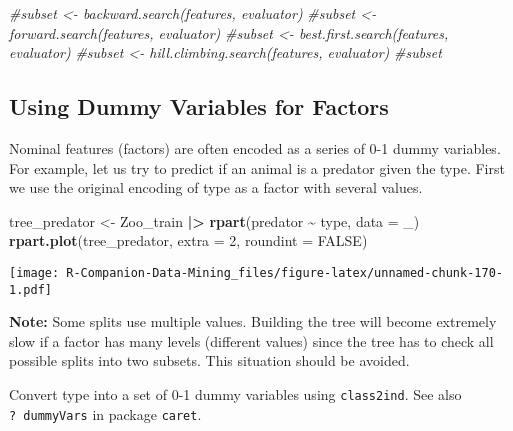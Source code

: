 \documentclass[
  notitlepage]{book}
\newenvironment{Shaded}{\begin{snugshade}}{\end{snugshade}}
\newcommand{\CommentTok}[1]{\textcolor[rgb]{0.56,0.35,0.01}{\textit{#1}}}
\newcommand{\DataTypeTok}[1]{\textcolor[rgb]{0.13,0.29,0.53}{#1}}
\newcommand{\DecValTok}[1]{\textcolor[rgb]{0.00,0.00,0.81}{#1}}
\newcommand{\ErrorTok}[1]{\textcolor[rgb]{0.64,0.00,0.00}{\textbf{#1}}}
\newcommand{\KeywordTok}[1]{\textcolor[rgb]{0.13,0.29,0.53}{\textbf{#1}}}
\newcommand{\NormalTok}[1]{#1}
\newcommand{\OperatorTok}[1]{\textcolor[rgb]{0.81,0.36,0.00}{\textbf{#1}}}
\newcommand{\OtherTok}[1]{\textcolor[rgb]{0.56,0.35,0.01}{#1}}
\newcommand{\StringTok}[1]{\textcolor[rgb]{0.31,0.60,0.02}{#1}}
\begin{document}
\begin{Shaded}
\begin{Highlighting}[]
\CommentTok{\#subset \textless{}{-} backward.search(features, evaluator)}
\CommentTok{\#subset \textless{}{-} forward.search(features, evaluator)}
\CommentTok{\#subset \textless{}{-} best.first.search(features, evaluator)}
\CommentTok{\#subset \textless{}{-} hill.climbing.search(features, evaluator)}
\CommentTok{\#subset}
\end{Highlighting}
\end{Shaded}

\hypertarget{using-dummy-variables-for-factors}{%
\subsection{Using Dummy Variables for Factors}\label{using-dummy-variables-for-factors}}

Nominal features (factors) are often encoded as a series of 0-1 dummy
variables. For example, let us try to predict if an animal is a predator
given the type. First we use the original encoding of type as a factor
with several values.

\begin{Shaded}
\begin{Highlighting}[]
\NormalTok{tree\_predator \textless{}{-}}\StringTok{ }\NormalTok{Zoo\_train }\OperatorTok{|}\ErrorTok{\textgreater{}}\StringTok{ }
\StringTok{  }\KeywordTok{rpart}\NormalTok{(predator }\OperatorTok{\textasciitilde{}}\StringTok{ }\NormalTok{type, }\DataTypeTok{data =}\NormalTok{ \_)}
\KeywordTok{rpart.plot}\NormalTok{(tree\_predator, }\DataTypeTok{extra =} \DecValTok{2}\NormalTok{, }\DataTypeTok{roundint =} \OtherTok{FALSE}\NormalTok{)}
\end{Highlighting}
\end{Shaded}

\texttt{[image: R-Companion-Data-Mining\_files/figure-latex/unnamed-chunk-170-1.pdf]}

\textbf{Note:} Some splits use multiple values. Building the tree will become
extremely slow if a factor has many levels (different values) since the
tree has to check all possible splits into two subsets. This situation
should be avoided.

Convert type into a set of 0-1 dummy variables using \texttt{class2ind}. See
also \texttt{?\ dummyVars} in package \texttt{caret}.
\end{document}
